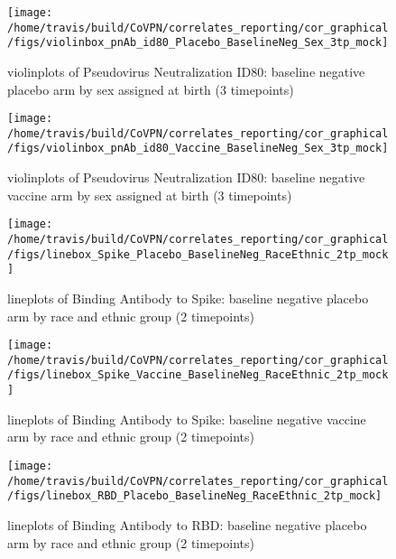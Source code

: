 \documentclass[]{book}
\theoremstyle{definition}
\theoremstyle{definition}
\theoremstyle{definition}
\newcommand{\1}{\mathbbm{1}}
\begin{document}
\clearpage
\begin{figure}[H]

{\centering \texttt{[image: /home/travis/build/CoVPN/correlates\_reporting/cor\_graphical/figs/violinbox\_pnAb\_id80\_Placebo\_BaselineNeg\_Sex\_3tp\_mock]} 

}

\caption{violinplots of Pseudovirus Neutralization ID80: baseline negative placebo arm by sex assigned at birth (3 timepoints)}\label{fig:unnamed-chunk-185}
\end{figure}

\clearpage
\begin{figure}[H]

{\centering \texttt{[image: /home/travis/build/CoVPN/correlates\_reporting/cor\_graphical/figs/violinbox\_pnAb\_id80\_Vaccine\_BaselineNeg\_Sex\_3tp\_mock]} 

}

\caption{violinplots of Pseudovirus Neutralization ID80: baseline negative vaccine arm by sex assigned at birth (3 timepoints)}\label{fig:unnamed-chunk-186}
\end{figure}

\clearpage
\begin{figure}[H]

{\centering \texttt{[image: /home/travis/build/CoVPN/correlates\_reporting/cor\_graphical/figs/linebox\_Spike\_Placebo\_BaselineNeg\_RaceEthnic\_2tp\_mock]} 

}

\caption{lineplots of Binding Antibody to Spike: baseline negative placebo arm by race and ethnic group (2 timepoints)}\label{fig:unnamed-chunk-187}
\end{figure}

\clearpage
\begin{figure}[H]

{\centering \texttt{[image: /home/travis/build/CoVPN/correlates\_reporting/cor\_graphical/figs/linebox\_Spike\_Vaccine\_BaselineNeg\_RaceEthnic\_2tp\_mock]} 

}

\caption{lineplots of Binding Antibody to Spike: baseline negative vaccine arm by race and ethnic group (2 timepoints)}\label{fig:unnamed-chunk-188}
\end{figure}

\clearpage
\begin{figure}[H]

{\centering \texttt{[image: /home/travis/build/CoVPN/correlates\_reporting/cor\_graphical/figs/linebox\_RBD\_Placebo\_BaselineNeg\_RaceEthnic\_2tp\_mock]} 

}

\caption{lineplots of Binding Antibody to RBD: baseline negative placebo arm by race and ethnic group (2 timepoints)}\label{fig:unnamed-chunk-189}
\end{figure}
\end{document}
